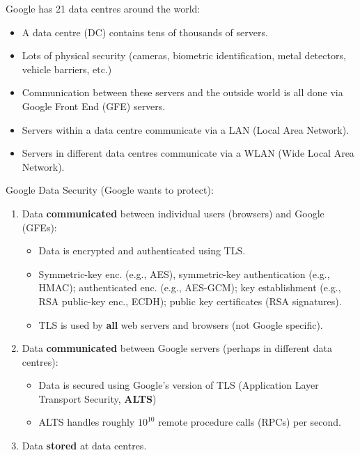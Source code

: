 \documentclass[12pt,titlepage]{article}
\begin{document}
Google has 21 data centres around the world: \begin{itemize}
	\item A data centre (DC) contains tens of thousands of servers.
	\item Lots of physical security (cameras, biometric identification, metal detectors, vehicle barriers, etc.)
	\item Communication between these servers and the outside world is all done via Google Front End (GFE) servers.
	\item Servers within a data centre communicate via a LAN (Local Area Network).
	\item Servers in different data centres communicate via a WLAN (Wide Local Area Network).
\end{itemize}

Google Data Security (Google wants to protect): \begin{enumerate}
	\item Data \textbf{communicated} between individual users (browsers) and Google (GFEs): \begin{itemize}
	\item Data is encrypted and authenticated using TLS.
	\item Symmetric-key enc. (e.g., AES), symmetric-key authentication (e.g., HMAC); authenticated enc. (e.g., AES-GCM); key establishment (e.g., RSA public-key enc., ECDH); public key certificates (RSA signatures).
	\item TLS is used by \textbf{all} web servers and browsers (not Google specific).
	\end{itemize}
	\item Data \textbf{communicated} between Google servers (perhaps in different data centres): \begin{itemize}
		\item Data is secured using Google’s version of TLS (Application Layer Transport Security, \textbf{ALTS})
		\item ALTS handles roughly $10^{10}$ remote procedure calls (RPCs) per second.
	\end{itemize}
	\item Data \textbf{stored} at data centres.
\end{enumerate}
\end{document}

